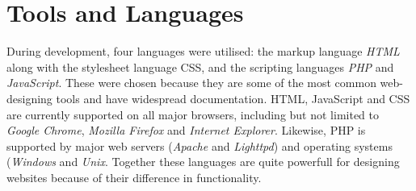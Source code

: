 \chapter{Tools and Languages}

During development, four languages were utilised: the markup language \emph{HTML} along with the stylesheet language {CSS}, and the scripting languages \emph{PHP} and \emph{JavaScript}. These were chosen because they are some of the most common web-designing tools and have widespread documentation. HTML, JavaScript and CSS are currently supported on all major browsers, including but not limited to \emph{Google Chrome}, \emph{Mozilla Firefox} and \emph{Internet Explorer}. Likewise, PHP is supported by major web servers (\emph{Apache} and \emph{Lighttpd}) and operating systems (\emph{Windows} and \emph{Unix}.
Together these languages are quite powerfull for designing websites because of their difference in functionality.
\label{implementation_tools_languages}
